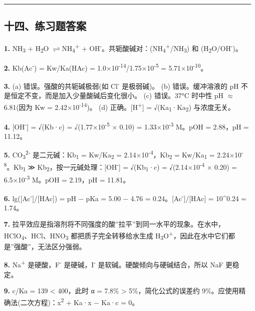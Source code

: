 \documentclass[a4paper,11pt]{ctexart}
\newcommand{\箭}{\ensuremath{\rightarrow}}
\newcommand{\左箭}{\ensuremath{\leftarrow}}
\newcommand{\上箭}{\ensuremath{\uparrow}}
\newcommand{\下箭}{\ensuremath{\downarrow}}
\newcommand{\衡}{\ensuremath{\rightleftharpoons}}
\newcommand{\双箭}{\ensuremath{\leftrightarrow}}
\newcommand{\约等于}{\ensuremath{\approx}}
\newcommand{\小于等于}{\ensuremath{\leq}}
\newcommand{\大于等于}{\ensuremath{\geq}}
\newcommand{\不等于}{\ensuremath{\neq}}
\newcommand{\西格马}{\ensuremath{\sigma}}
\newcommand{\派}{\ensuremath{\pi}}
\begin{document}
\begin{center}\rule{0.5\linewidth}{0.5pt}\end{center}

\subsection{十四、练习题答案}\label{ux5341ux56dbux7ec3ux4e60ux9898ux7b54ux6848}

\textbf{1.} NH\textsubscript{3} + H\textsubscript{2}O \衡 NH\textsubscript{4}\textsuperscript{+} + OH\textsuperscript{-}。共轭酸碱对：(NH\textsubscript{4}\textsuperscript{+}/NH\textsubscript{3}) 和 (H\textsubscript{2}O/OH\textsuperscript{-})。

\textbf{2.} Kb(Ac\textsuperscript{-}) = Kw/Ka(HAc) = 1.0×10\textsuperscript{-14}/1.75×10\textsuperscript{-5} = 5.71×10\textsuperscript{-10}。

\textbf{3.}
(a) 错误。强酸的共轭碱极弱(如 Cl\textsuperscript{-} 是极弱碱)。
(b) 错误。缓冲溶液的 pH 不是恒定不变，而是加入少量酸碱后变化很小。
(c) 错误。37°C 时中性 pH \约等于 6.81(因为 Kw = 2.42×10\textsuperscript{-14})。
(d) 正确。{[}H\textsuperscript{+}{]} = √(Ka\textsubscript{1}·Ka\textsubscript{2}) 与浓度无关。

\textbf{4.} {[}OH\textsuperscript{-}{]} = √(Kb·c) = √(1.77×10\textsuperscript{-5} × 0.10) = 1.33×10\textsuperscript{-3} M。pOH = 2.88，pH = 11.12。

\textbf{5.} CO\textsubscript{3}\textsuperscript{2-} 是二元碱：Kb\textsubscript{1} = Kw/Ka\textsubscript{2} = 2.14×10\textsuperscript{-4}，Kb\textsubscript{2} = Kw/Ka\textsubscript{1} = 2.24×10\textsuperscript{-8}。Kb\textsubscript{1} ≫ Kb\textsubscript{2}，按一元碱处理：{[}OH\textsuperscript{-}{]} = √(Kb\textsubscript{1}·c) = √(2.14×10\textsuperscript{-4} × 0.20) = 6.5×10\textsuperscript{-3} M。pOH = 2.19，pH = 11.81。

\textbf{6.} lg({[}Ac\textsuperscript{-}{]}/{[}HAc{]}) = pH − pKa = 5.00 − 4.76 = 0.24。{[}Ac\textsuperscript{-}{]}/{[}HAc{]} = 10\^{}0.24 = 1.74。

\textbf{7.} 拉平效应是指溶剂将不同强度的酸''拉平''到同一水平的现象。在水中，HClO\textsubscript{4}、HCl、HNO\textsubscript{3} 都把质子完全转移给水生成 H\textsubscript{3}O\textsuperscript{+}，因此在水中它们都是''强酸''，无法区分强弱。

\textbf{8.} Na\textsuperscript{+} 是硬酸，F\textsuperscript{-} 是硬碱，I\textsuperscript{-} 是软碱。硬酸倾向与硬碱结合，所以 NaF 更稳定。

\textbf{9.} c/Ka = 139 \textless{} 400，此时 α = 7.8\% \textgreater{} 5\%，简化公式的误差约 9\%。应使用精确法(二次方程)：x\textsuperscript{2} + Ka·x − Ka·c = 0。
\end{document}
